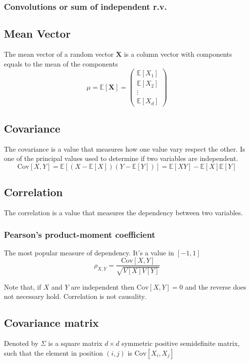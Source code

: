 \subsubsection{Convolutions or sum of independent r.v.}

\subsection{Mean Vector}
The mean vector of a random vector $\textbf{X}$ is a column vector with
components equals to the mean of the components
\[ \mu = \mathbb{E}[\textbf{X}] = 
\begin{pmatrix}
    \mathbb{E}[X_1]\\\mathbb{E}[X_2]\\\vdots\\\mathbb{E}[X_d]
\end{pmatrix}
\]

\subsection{Covariance}
The covariance is a value that measures how one value vary respect the other. Is
one of the principal values used to determine if two variables are independent.
\[ \text{Cov}[X,Y] = \mathbb{E}[(X-\mathbb{E}[X])(Y-\mathbb{E}[Y])] =
\mathbb{E}[XY]-\mathbb{E}[X]\mathbb{E}[Y] \]

\subsection{Correlation}
The correlation is a value that measures the dependency between two variables.
\subsubsection{Pearson's product-moment coefficient}
The most popular measure of dependency. It's a value in $[-1,1]$ 
\[ \rho_{X,Y} = \frac{\text{Cov}[X,Y]}{\sqrt{V[X]V[Y]}} \]
\begin{tcolorbox}
    Note that, if $X$ and $Y$ are independent then $\text{Cov}[X,Y]=0$ and the
    reverse does not necessary hold. Correlation is not causality.    
\end{tcolorbox}

\subsection{Covariance matrix}
Denoted by $\Sigma$ is a square matrix $d \times d$ symmetric positive
semidefinite matrix, such that the element in position $(i,j)$ is
$\text{Cov}[X_i,X_j]$

